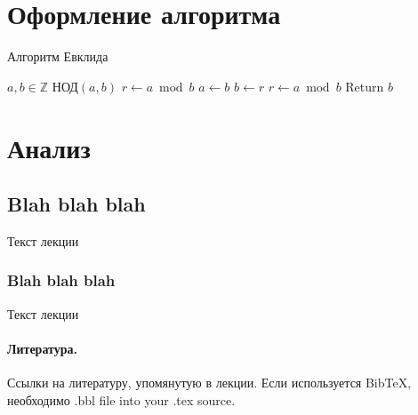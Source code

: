 \documentclass[11pt]{article}
\begin{document}
\section{Оформление алгоритма}



\begin{algorithm}[h]
	\caption{Алгоритм Евклида}\label{alg:euclid}
	\begin{algorithmic}[1]
		\Require $a,b \in \mathbb{Z}$
		\Ensure $\text{НОД}(a,b)$
		\State $r\gets a\bmod b$
		\State $a\gets b$
		\State $b\gets r$
		\State $r\gets a\bmod b$
		\EndWhile 
		\State Return $b$
	\end{algorithmic}

\end{algorithm}


\section{Анализ}
\subsection{Blah blah blah}
Текст лекции

\subsubsection{Blah blah blah}
Текст лекции




\paragraph{Литература.}
Ссылки на литературу, упомянутую в лекции. Если используется BibTeX, необходимо  .bbl file into your .tex
source. 
\end{document}
